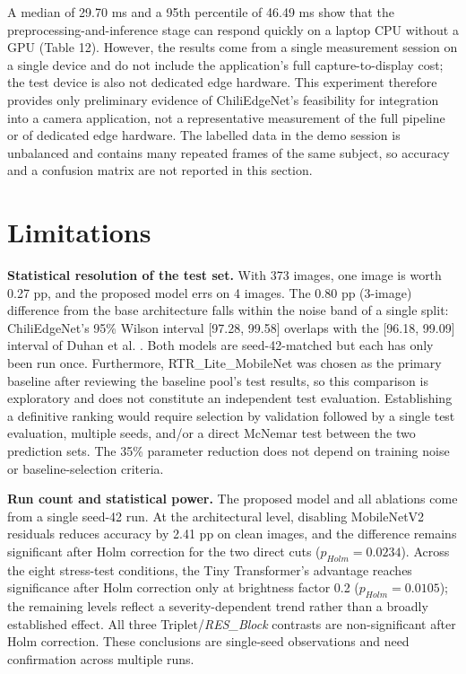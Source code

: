 A median of 29.70 ms and a 95th percentile of 46.49 ms show that the preprocessing-and-inference stage can respond quickly on a laptop CPU without a GPU (Table 12). However, the results come from a single measurement session on a single device and do not include the application's full capture-to-display cost; the test device is also not dedicated edge hardware. This experiment therefore provides only preliminary evidence of ChiliEdgeNet's feasibility for integration into a camera application, not a representative measurement of the full pipeline or of dedicated edge hardware. The labelled data in the demo session is unbalanced and contains many repeated frames of the same subject, so accuracy and a confusion matrix are not reported in this section.

\FloatBarrier

\section{Limitations}\label{limitations}

\textbf{Statistical resolution of the test set.} With 373 images, one image is worth 0.27 pp, and the proposed model errs on 4 images. The 0.80 pp (3-image) difference from the base architecture \cite{duhan2025} falls within the noise band of a single split: ChiliEdgeNet's 95\% Wilson interval {[}97.28, 99.58{]} overlaps with the {[}96.18, 99.09{]} interval of Duhan et al. \cite{duhan2025}. Both models are seed-42-matched but each has only been run once. Furthermore, RTR\_Lite\_MobileNet \cite{duhan2025} was chosen as the primary baseline after reviewing the baseline pool's test results, so this comparison is exploratory and does not constitute an independent test evaluation. Establishing a definitive ranking would require selection by validation followed by a single test evaluation, multiple seeds, and/or a direct McNemar test between the two prediction sets. The 35\% parameter reduction does not depend on training noise or baseline-selection criteria.

\textbf{Run count and statistical power.} The proposed model and all ablations come from a single seed-42 run. At the architectural level, disabling MobileNetV2 residuals reduces accuracy by 2.41 pp on clean images, and the difference remains significant after Holm correction for the two direct cuts ($p_{Holm} = 0.0234$). Across the eight stress-test conditions, the Tiny Transformer's advantage reaches significance after Holm correction only at brightness factor 0.2 ($p_{Holm} = 0.0105$); the remaining levels reflect a severity-dependent trend rather than a broadly established effect. All three Triplet/\emph{RES\_Block} contrasts are non-significant after Holm correction. These conclusions are single-seed observations and need confirmation across multiple runs.

